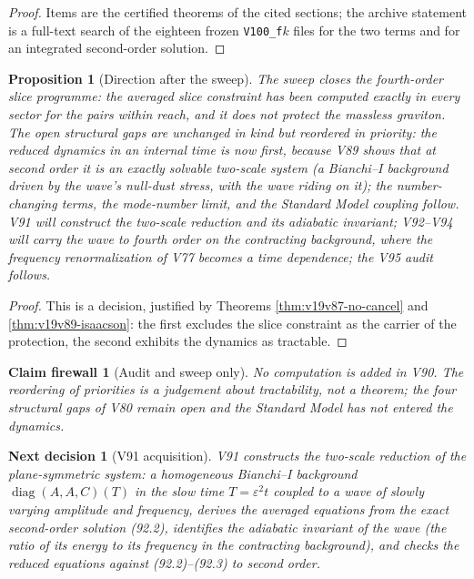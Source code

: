 \documentclass[11pt]{article}
\newtheorem{proposition}[theorem]{Proposition}
\newtheorem{firewall}[theorem]{Claim firewall}
\newtheorem{decision}[theorem]{Next decision}
\theoremstyle{remark}
\begin{document}
\begin{proof}
Items are the certified theorems of the cited sections; the archive
statement is a full-text search of the eighteen frozen
\texttt{V100\_f}\(k\) files for the two terms and for an integrated
second-order solution.
\end{proof}

\begin{proposition}[Direction after the sweep]
\label{prop:v19v90-direction}
The sweep closes the fourth-order slice programme: the averaged slice
constraint has been computed exactly in every sector for the pairs
within reach, and it does not protect the massless graviton.  The
open structural gaps are unchanged in kind but reordered in priority:
the reduced dynamics in an internal time is now first, because V89
shows that at second order it is an exactly solvable two-scale system
(a Bianchi--I background driven by the wave's null-dust stress, with
the wave riding on it); the number-changing terms, the mode-number
limit, and the Standard Model coupling follow.  V91 will construct
the two-scale reduction and its adiabatic invariant; V92--V94 will
carry the wave to fourth order on the contracting background, where
the frequency renormalization of V77 becomes a time dependence; the
V95 audit follows.
\end{proposition}

\begin{proof}
This is a decision, justified by Theorems \ref{thm:v19v87-no-cancel}
and \ref{thm:v19v89-isaacson}: the first excludes the slice
constraint as the carrier of the protection, the second exhibits the
dynamics as tractable.
\end{proof}

\begin{firewall}[Audit and sweep only]
\label{fire:v19v90}
No computation is added in V90.  The reordering of priorities is a
judgement about tractability, not a theorem; the four structural
gaps of V80 remain open and the Standard Model has not entered the
dynamics.
\end{firewall}

\begin{decision}[V91 acquisition]
\label{dec:v19v90-next}
V91 constructs the two-scale reduction of the plane-symmetric system:
a homogeneous Bianchi--I background \(\operatorname{diag}(A,A,C)(T)\)
in the slow time \(T=\varepsilon^2t\) coupled to a wave of slowly
varying amplitude and frequency, derives the averaged equations from
the exact second-order solution (92.2), identifies the adiabatic
invariant of the wave (the ratio of its energy to its frequency in
the contracting background), and checks the reduced equations against
(92.2)--(92.3) to second order.
\end{decision}
\end{document}
